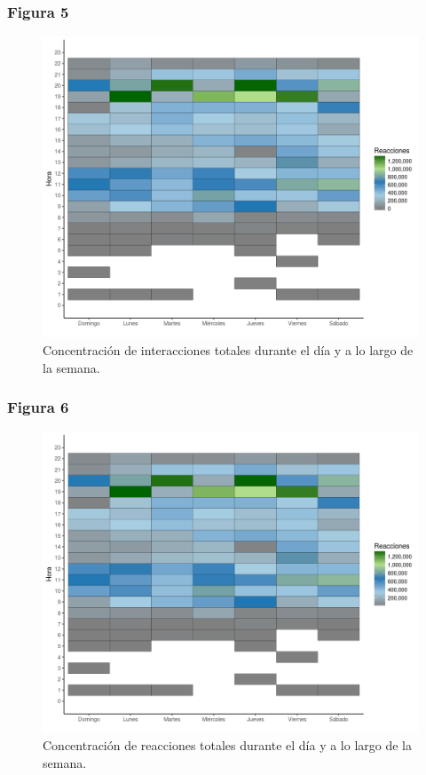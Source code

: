 \documentclass[a4paper,10pt]{article}
\begin{document}
\subsubsection{Figura 5}
\begin{figure}[H]
  \begin{center}
   \includegraphics[width=.85\textwidth]{imagenes/figura5.png}
   \captionsetup{width=.80\textwidth}
   \caption{\centering Concentración de interacciones totales durante el día y a 
   lo largo de la semana.} 
  \end{center} 
\end{figure}


\subsubsection{Figura 6}
\begin{figure}[H]
  \begin{center}
   \includegraphics[width=.85\textwidth]{imagenes/figura6.png}
   \captionsetup{width=.80\textwidth}
   \caption{\centering Concentración de reacciones totales durante el día y a 
   lo largo de la semana.} 
  \end{center} 
\end{figure}
\end{document}
